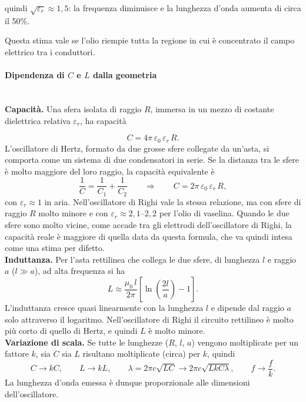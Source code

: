 quindi $\sqrt{\varepsilon_r} \approx 1{,}5$: 
la frequenza diminuisce e la lunghezza d'onda aumenta di circa il 50\%. 

Questa stima vale se l'olio riempie tutta la regione in cui è concentrato il campo elettrico tra i conduttori.

\paragraph{Dipendenza di $C$ e $L$ dalla geometria}\mbox{}\\

\noindent \textbf{Capacità.}  Una sfera isolata di raggio $R$, immersa in un mezzo di costante dielettrica relativa $\varepsilon_r$, ha capacità

\begin{equation}
    C = 4\pi\,\varepsilon_0\,\varepsilon_r\,R .
\end{equation}
L'oscillatore di Hertz, formato da due grosse sfere collegate da un'asta, si comporta come un sistema di due condensatori in serie. Se la distanza tra le sfere è molto maggiore del loro raggio, la capacità equivalente è
\begin{equation}
    \frac{1}{C} = \frac{1}{C_1} + \frac{1}{C_2}
    \qquad\Longrightarrow\qquad
    C = 2\pi\,\varepsilon_0\,\varepsilon_r\,R ,
\end{equation}
con $\varepsilon_r \approx 1$ in aria. Nell'oscillatore di Righi vale la stessa relazione, ma con sfere di raggio $R$ molto minore e con $\varepsilon_r \approx 2{,}1$--$2{,}2$ per l'olio di vaselina. Quando le due sfere sono molto vicine, come accade tra gli elettrodi dell'oscillatore di Righi, la capacità reale è maggiore di quella data da questa formula, che va quindi intesa come una stima per difetto.\\


\noindent \textbf{Induttanza.} Per l'asta rettilinea che collega le due sfere, di lunghezza $l$ e raggio $a$ ($l \gg a$), ad alta frequenza si ha
\begin{equation}
    L \approx \frac{\mu_0\, l}{2\pi}\left[\ln\!\left(\frac{2l}{a}\right) - 1\right] .
\end{equation}
L'induttanza cresce quasi linearmente con la lunghezza $l$ e dipende dal raggio $a$ solo attraverso il logaritmo. Nell'oscillatore di Righi il circuito rettilineo è molto più corto di quello di Hertz, e quindi $L$ è molto minore.\\

\noindent \textbf{Variazione di scala.} Se tutte le lunghezze ($R$, $l$, $a$) vengono moltiplicate per un fattore $k$, sia $C$ sia $L$ risultano moltiplicate (circa) per $k$, quindi
\begin{equation}
    C \to kC , \qquad L \to kL ,
    \qquad
    \lambda = 2\pi c\sqrt{LC} \to 2\pi c\sqrt{LkC\lambda} ,
    \qquad
    f \to \frac{f}{k} .
\end{equation}
La lunghezza d'onda emessa è dunque proporzionale alle dimensioni dell'oscillatore.